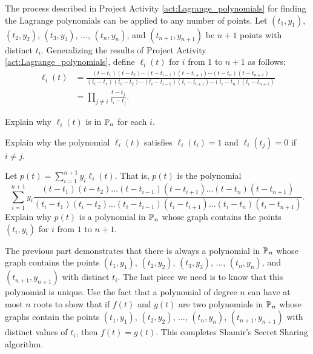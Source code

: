 \begin{pactivity} \label{act:SSS_Lagrange_general}  The process described in Project Activity \ref{act:Lagrange_polynomials} for finding the Lagrange polynomials can be applied to any number of points. Let $(t_1,y_1)$, $(t_2,y_2)$, $(t_3,y_3)$, $\ldots$, $(t_n,y_n)$, and $(t_{n+1},y_{n+1})$ be $n+1$ points with distinct $t_i$. Generalizing the results of Project Activity \ref{act:Lagrange_polynomials}, define $\ell_i(t)$ for $i$ from $1$ to $n+1$ as follows:
\begin{align*}
\ell_i(t) &= \frac{(t-t_1)(t-t_2) \cdots (t-t_{i-1})(t-t_{i+1}) \cdots (t-t_n)(t-t_{n+1})}{(t_i-t_1)(t_i-t_2) \cdots (t_i-t_{i-1})(t_i-t_{i+1}) \cdots (t_i-t_n)(t_i-t_{n+1})} \\
	&=\prod_{j \neq i} \frac{t-t_j}{t_i-t_j}. 
\end{align*}
\ba
\item Explain why $\ell_i(t)$ is in $\mathbb{P}_n$ for each $i$.

    \item Explain why the polynomial $\ell_i(t)$ satisfies $\ell_i(t_i) = 1$ and $\ell_i(t_j) = 0$ if $i \neq j$.
    
    \item Let $p(t) =  \sum_{i=1}^{n+1} y_i \ell_i(t)$. That is, $p(t)$ is the polynomial 
    \[\sum_{i=1}^{n+1} y_i \frac{(t-t_1)(t-t_2) \dots (t-t_{i-1})(t-t_{i+1}) \dots (t-t_n)(t-t_{n+1})}{(t_i-t_1)(t_i-t_2) \dots (t_i-t_{i-1})(t_i-t_{i+1}) \dots (t_i-t_n)(t_i-t_{n+1})}.\]
   Explain why $p(t)$ is a polynomial in $\mathbb{P}_n$ whose graph contains the points $(t_i,y_i)$ for $i$ from $1$ to $n+1$. 
         

	\item The previous part demonstrates that there is always a polynomial in $\mathbb{P}_n$ whose graph contains the points $(t_1,y_1)$, $(t_2,y_2)$, $(t_3,y_3)$, $\ldots$, $(t_n,y_n)$, and $(t_{n+1},y_{n+1})$  with distinct $t_i$. The last piece we need is to know that this polynomial is unique. Use the fact that a polynomial of degree $n$ can have at most $n$ roots to show that if $f(t)$ and $g(t)$ are two polynomials in $\mathbb{P}_n$ whose graphs contain the points $(t_1,y_1)$, $(t_2,y_2)$, $\ldots$, $(t_n,y_n)$, $(t_{n+1},y_{n+1})$ with distinct values of $t_i$, then $f(t) = g(t)$. This completes Shamir's Secret Sharing algorithm. 
  
             
\ea

\end{pactivity}
 

